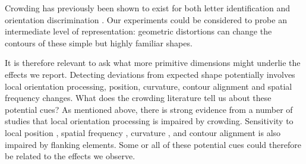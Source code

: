 \documentclass[doc, 11pt,a4paper,natbib]{apa6}\usepackage[]{graphicx}\usepackage[]{color}
\begin{document}
Crowding has previously been shown to exist for both letter identification
\citep{bouma_interaction_1970, pelli_crowding_2004, chung_spatialfrequency_2002, estes_similarity-related_1982}
and orientation discrimination
\citep{andriessen_eccentric_1975, parkes_compulsory_2001, wilkinson_lateral_1997, pelli_crowding_2004, harrison_unifying_2015}.
Our experiments could be considered to probe an intermediate level of representation: geometric distortions can change the contours of these simple but highly familiar shapes.

It is therefore relevant to ask what more primitive dimensions might underlie the effects we report.
Detecting deviations from expected shape potentially involves local orientation processing, position, curvature, contour alignment and spatial frequency changes.
What does the crowding literature tell us about these potential cues?
As mentioned above, there is strong evidence from a number of studies that local orientation processing is impaired by crowding.
Sensitivity to local position \citep{dakin_probabilistic_2010,greenwood_positional_2009,greenwood_crowding_2012}, spatial frequency \citep{wilkinson_lateral_1997}, curvature \citep{kramer_simple_1996}, and contour alignment \citep{robol_role_2012, dakin_context_2009, may_ladder_2007, chakravarthi_same_2011} is also impaired by flanking elements.
Some or all of these potential cues could therefore be related to the effects we observe.

\end{document}
